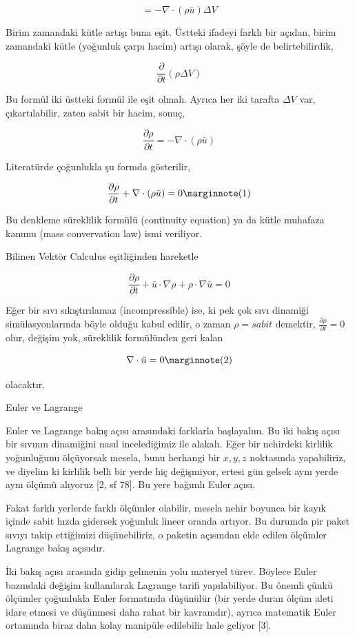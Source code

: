 \documentclass[12pt,fleqn]{article}\usepackage{../../common}
\begin{document}
$$
= -\nabla \cdot (\rho \bar{u} ) \Delta V
$$

Birim zamandaki kütle artışı buna eşit. Üstteki ifadeyi farklı bir açıdan, birim
zamandaki kütle (yoğunluk çarpı hacim) artışı olarak, şöyle de belirtebilirdik,

$$
\frac{\partial }{\partial t} (\rho \Delta V) 
$$

Bu formül iki üstteki formül ile eşit olmalı. Ayrıca her iki tarafta $\Delta V$
var, çıkartılabilir, zaten sabit bir hacim, sonuç,

$$
\frac{\partial \rho}{\partial t}  = -\nabla \cdot (\rho \bar{u} )
$$

Literatürde çoğunlukla şu formda gösterilir,

$$
\frac{\partial \rho}{\partial t}  + \nabla \cdot (\rho \bar{u} ) = 0
\mlabel{1}
$$

Bu denkleme süreklilik formülü (continuity equation) ya da kütle muhafaza kanunu
(mass convervation law) ismi veriliyor.

Bilinen Vektör Calculus eşitliğinden hareketle

$$
\frac{\partial \rho}{\partial t}  +
\bar{u} \cdot \nabla \rho +
\rho \cdot \nabla \bar{u} = 0
$$

Eğer bir sıvı sıkıştırılamaz (incompressible) ise, ki pek çok sıvı dinamiği
simülasyonlarında böyle olduğu kabul edilir, o zaman $\rho = sabit$ demektir,
$\frac{\partial \rho}{\partial t} = 0 $ olur, değişim yok, süreklilik
formülünden geri kalan

$$
\nabla \cdot \bar{u} = 0
\mlabel{2}
$$

olacaktır. 

Euler ve Lagrange

Euler ve Lagrange bakış açısı arasındaki farklarla başlayalım. Bu iki bakış
açısı bir sıvının dinamiğini nasıl incelediğimiz ile alakalı. Eğer bir nehirdeki
kirlilik yoğunluğunu ölçüyorsak mesela, bunu herhangi bir $x,y,z$ noktasında
yapabiliriz, ve diyelim ki kirlilik belli bir yerde hiç değişmiyor, ertesi gün
gelsek aynı yerde aynı ölçümü alıyoruz [2, sf 78]. Bu yere bağımlı Euler açısı.

Fakat farklı yerlerde farklı ölçümler olabilir, mesela nehir boyunca bir kayık
içinde sabit hızda gidersek yoğunluk lineer oranda artıyor. Bu durumda pir paket
sıvıyı takip ettiğimizi düşünebiliriz, o paketin açısından elde edilen ölçümler
Lagrange bakış açısıdır. 

İki bakış açısı arasında gidip gelmenin yolu materyel türev. Böylece Euler
bazındaki değişim kullanılarak Lagrange tarifi yapılabiliyor. Bu önemli çünkü
ölçümler çoğunlukla Euler formatında düşünülür (bir yerde duran ölçüm aleti
idare etmesi ve düşünmesi daha rahat bir kavramdır), ayrıca matematik Euler
ortamında biraz daha kolay manipüle edilebilir hale geliyor [3].
\end{document}
